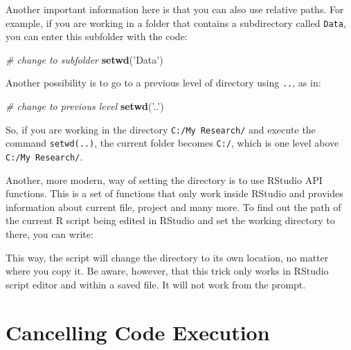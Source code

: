 \documentclass[11pt,]{book}
\newenvironment{Shaded}{\begin{snugshade}}{\end{snugshade}}
\newcommand{\KeywordTok}[1]{\textcolor[rgb]{0.27,0.27,0.27}{\textbf{#1}}}
\newcommand{\StringTok}[1]{\textcolor[rgb]{0.5,0.5,0.5}{#1}}
\newcommand{\CommentTok}[1]{\textcolor[rgb]{0.56,0.35,0.01}{\textit{#1}}}
\newcommand{\OperatorTok}[1]{\textcolor[rgb]{0.81,0.36,0.00}{\textbf{#1}}}
\newcommand{\NormalTok}[1]{#1}
\begin{document}
Another important information here is that you can also use relative
paths. For example, if you are working in a folder that contains a
subdirectory called \texttt{Data}, you can enter this subfolder with the
code:

\begin{Shaded}
\begin{Highlighting}[]
\CommentTok{# change to subfolder}
\KeywordTok{setwd}\NormalTok{(}\StringTok{'Data'}\NormalTok{)}
\end{Highlighting}
\end{Shaded}

Another possibility is to go to a previous level of directory using
\texttt{..}, as in:

\begin{Shaded}
\begin{Highlighting}[]
\CommentTok{# change to previous level}
\KeywordTok{setwd}\NormalTok{(}\StringTok{'..'}\NormalTok{)}
\end{Highlighting}
\end{Shaded}

So, if you are working in the directory \texttt{C:/My\ Research/} and
execute the command
\texttt{setwd(\textquotesingle{}..\textquotesingle{})}, the current
folder becomes \texttt{C:/}, which is one level above
\texttt{C:/My\ Research/}.

Another, more modern, way of setting the directory is to use RStudio API
functions. This is a set of functions that only work inside RStudio and
provides information about current file, project and many more. To find
out the path of the current R script being edited in RStudio and set the
working directory to there, you can write:

\begin{Shaded}
\end{Shaded}

This way, the script will change the directory to its own location, no
matter where you copy it. Be aware, however, that this trick only works
in RStudio script editor and within a saved file. It will not work from
the prompt.

\section{Cancelling Code Execution}\label{cancelling-code-execution}
\end{document}
